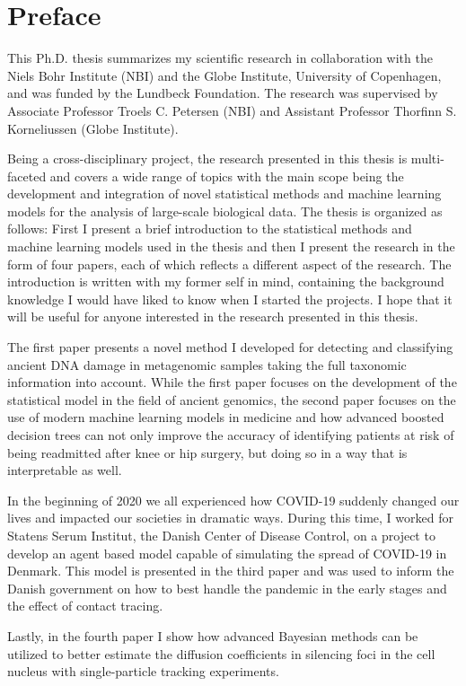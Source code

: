 \chapter{Preface}
This Ph.D. thesis summarizes my scientific research in collaboration with the Niels Bohr Institute (NBI) and the Globe Institute, University of Copenhagen, and was funded by the Lundbeck Foundation. The research was supervised by Associate Professor Troels C. Petersen (NBI) and Assistant Professor Thorfinn S. Korneliussen (Globe Institute).

Being a cross-disciplinary project, the research presented in this thesis is multi-faceted and covers a wide range of topics with the main scope being the development and integration of novel statistical methods and machine learning models for the analysis of large-scale biological data. The thesis is organized as follows: First I present a brief introduction to the statistical methods and machine learning models used in the thesis and then I present the research in the form of four papers, each of which reflects a different aspect of the research. The introduction is written with my former self in mind, containing the background knowledge I would have liked to know when I started the projects. I hope that it will be useful for anyone interested in the research presented in this thesis.

The first paper presents a novel method I developed for detecting and classifying ancient DNA damage in metagenomic samples taking the full taxonomic information into account. While the first paper focuses on the development of the statistical model in the field of ancient genomics, the second paper focuses on the use of modern machine learning models in medicine and how advanced boosted decision trees can not only improve the accuracy of identifying patients at risk of being readmitted after knee or hip surgery, but doing so in a way that is interpretable as well.

In the beginning of 2020 we all experienced how COVID-19 suddenly changed our lives and impacted our societies in dramatic ways. During this time, I worked for Statens Serum Institut, the Danish Center of Disease Control, on a project to develop an agent based model capable of simulating the spread of COVID-19 in Denmark. This model is presented in the third paper and was used to inform the Danish government on how to best handle the pandemic in the early stages and the effect of contact tracing.

Lastly, in the fourth paper I show how advanced Bayesian methods can be utilized to better estimate the diffusion coefficients in silencing foci in the cell nucleus with single-particle tracking experiments.